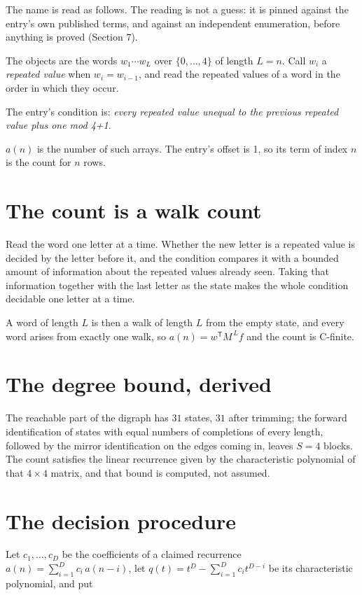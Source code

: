 \documentclass[11pt]{article}
\theoremstyle{definition}
\begin{document}
The name is read as follows. The reading is not a guess: it is pinned against the entry's own published terms, and against an independent enumeration, before anything is proved (Section 7).

The objects are the words $w_1\cdots w_L$ over $\{0,\dots,4\}$ of length $L = n$. Call $w_i$ a {\itshape repeated value} when $w_i = w_{i-1}$, and read the repeated values of a word in the order in which they occur.

The entry's condition is: {\itshape every repeated value unequal to the previous repeated value plus one mod 4+1}.

$a(n)$ is the number of such arrays. The entry's offset is 1, so its term of index $n$ is the count for $n$ rows.

\section{The count is a walk count}

Read the word one letter at a time. Whether the new letter is a repeated value is decided by the letter before it, and the condition compares it with a bounded amount of information about the repeated values already seen. Taking that information together with the last letter as the state makes the whole condition decidable one letter at a time.

A word of length $L$ is then a walk of length $L$ from the empty state, and every word arises from exactly one walk, so $a(n) = w^{\mathsf T}M^{\,L}f$ and the count is C-finite.

\section{The degree bound, derived}

The reachable part of the digraph has $31$ states, $31$ after trimming; the forward identification of states with equal numbers of completions of every length, followed by the mirror identification on the edges coming in, leaves $S = 4$ blocks. The count satisfies the linear recurrence given by the characteristic polynomial of that $4\times4$ matrix, and that bound is computed, not assumed.

\section{The decision procedure}

Let $c_1,\dots,c_D$ be the coefficients of a claimed recurrence $a(n) = \sum_{i=1}^{D} c_i\,a(n-i)$, let $q(t) = t^{D} - \sum_{i=1}^{D} c_i t^{D-i}$ be its characteristic polynomial, and put
\end{document}
